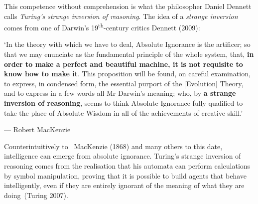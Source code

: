 \documentclass[
  letterpaper,
  12pt,
  british]{tufte-book}
\renewenvironment{quote}{
  \list{}{\leftmargin=3.5cm\topsep=0pt}
  \item\relax\small\itshape
}
{\endlist}
\theoremstyle{plain}
\theoremstyle{definition}
\theoremstyle{plain}
\theoremstyle{remark}
\begin{document}
This competence without comprehension is what the philosopher Daniel
Dennett calls \emph{Turing's strange inversion of reasoning}. The idea of a \emph{strange inversion} comes from one of
Darwin's 19\textsuperscript{th}-century critics Dennett
(2009):

\begin{quote}
`In the theory with which we have to deal, Absolute Ignorance is the
artificer; so that we may enunciate as the fundamental principle of the
whole system, that, \textbf{in order to make a perfect and beautiful
machine, it is not requisite to know how to make it}. This proposition
will be found, on careful examination, to express, in condensed form,
the essential purport of the {[}Evolution{]} Theory, and to express in a
few words all Mr Darwin's meaning; who, by \textbf{a strange inversion
of reasoning}, seems to think Absolute Ignorance fully qualified to take
the place of Absolute Wisdom in all of the achievements of creative
skill.'

--- Robert MacKenzie\\
\end{quote}

Counterintuitively to ~MacKenzie
(1868)
and many others to this date, intelligence can emerge from absolute
ignorance. Turing's strange inversion of reasoning comes from the
realisation that his automata can perform calculations by symbol
manipulation, proving that it is possible to build agents that behave
intelligently, even if they are entirely ignorant of the meaning of what
they are doing~(Turing
2007).
\end{document}
